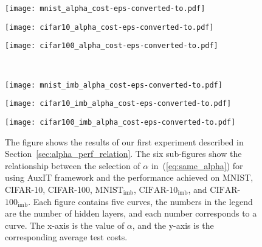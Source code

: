 \documentclass[a4paper]{article}
\begin{document}
  \begin{figure*}[!ht]
    \hspace{-0.8cm}
    \centering
    \begin{minipage}[b]{.3\textwidth}
      \texttt{[image: mnist\_alpha\_cost-eps-converted-to.pdf]}
    \end{minipage}\qquad
    \begin{minipage}[b]{.3\textwidth}
      \texttt{[image: cifar10\_alpha\_cost-eps-converted-to.pdf]}
    \end{minipage}\qquad
    \begin{minipage}[b]{.3\textwidth}
      \texttt{[image: cifar100\_alpha\_cost-eps-converted-to.pdf]}
    \end{minipage}\qquad \\
    \hspace{-0.8cm}
    \begin{minipage}[b]{.3\textwidth}
      \texttt{[image: mnist\_imb\_alpha\_cost-eps-converted-to.pdf]}
    \end{minipage}\qquad
    \begin{minipage}[b]{.3\textwidth}
      \texttt{[image: cifar10\_imb\_alpha\_cost-eps-converted-to.pdf]}
    \end{minipage}\qquad
    \begin{minipage}[b]{.3\textwidth}
      \texttt{[image: cifar100\_imb\_alpha\_cost-eps-converted-to.pdf]}
    \end{minipage}\qquad
    \caption{
      The figure shows the results of our first experiment described in Section~\ref{sec:alpha_perf_relation}.
      The six sub-figures show the relationship between the selection of $\alpha$ in~(\ref{eq:same_alpha}) for using AuxIT framework and the performance achieved on MNIST, CIFAR-10, CIFAR-100, $\mathrm{MNIST}_{\mathrm{imb}}$, $\mathrm{CIFAR}$-$\mathrm{10}_{\mathrm{imb}}$, and $\mathrm{CIFAR}$-$\mathrm{100}_{\mathrm{imb}}$.
      Each figure contains five curves, the numbers in the legend are the number of hidden layers, and each number corresponds to a curve.
      The x-axis is the value of $\alpha$, and the y-axis is the corresponding average test costs.
    }
    \label{fig:alpha_plot}
  \end{figure*}
\end{document}
